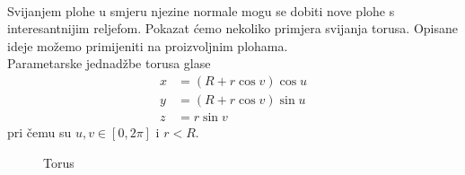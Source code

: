 \documentclass[a4paper,12pt]{article}
\theoremstyle{zad}
\begin{document}
\begin{center}
\\[2pt]
\end{center}
Svijanjem plohe u smjeru njezine normale mogu se dobiti nove plohe s interesantnijim reljefom. Pokazat \'cemo nekoliko
primjera svijanja torusa. Opisane ideje mo\v{z}emo primijeniti na proizvoljnim plohama.\\[5pt] 
Parametarske jednad\v{z}be torusa glase
\begin{align*}
x&=(R+r\cos{v})\cos{u}\\
y&=(R+r\cos{v})\sin{u}\\
z&=r\sin{v}
\end{align*}
pri \v{c}emu su $u,v\in[0,2\pi]$ i $r<R$.

\begin{figure}[!h]
\centering
{}\hspace*{0.5cm}
\vspace*{-10pt}
\caption{Torus}
\label{slika12}
\end{figure} 
\end{document}
